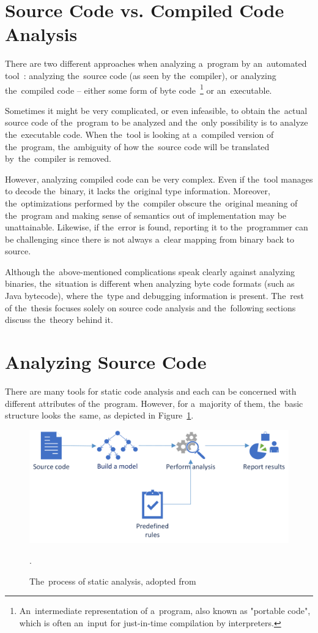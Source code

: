 \documentclass[
  digital, %
  table,   %
  lof,     %
  lot,     %
  oneside,
]{fithesis3}
\begin{document}
\section{Source Code vs. Compiled Code Analysis}
There are two different approaches when analyzing a~program by an~automated tool~\cite{secure-programming-with-sca}: analyzing the~source code (as seen by the~compiler), or analyzing the~compiled code -- either some form of byte code~\footnote{An~intermediate representation of a~program, also known as "portable code", which is often an~input for just-in-time compilation by interpreters.} or an~executable.

Sometimes it might be very complicated, or even infeasible, to obtain the~actual source code of the~program to be analyzed and the~only possibility is to analyze the~executable code. When the~tool is looking at a~compiled version of the~program, the~ambiguity of how the~source code will be translated by~the~compiler is removed.

However, analyzing compiled code can be very complex. Even if the~tool manages to decode the~binary, it lacks the~original type information. Moreover, the~optimizations performed by the~compiler obscure the~original meaning of the~program and making sense of semantics out of implementation may be unattainable. Likewise, if the~error is found, reporting it to the~programmer can be challenging since there is not always a~clear mapping from binary back to source. 

Although the~above-mentioned complications speak clearly against analyzing binaries, the~situation is different when analyzing byte code formats (such as Java bytecode), where the~type and debugging information is present. The~rest of the~thesis focuses solely on source code analysis and the~following sections discuss the~theory behind it.

\section{Analyzing Source Code}
There are many tools for static code analysis and each can be concerned with different attributes of the~program. However, for a~majority of them, the~basic structure looks the~same, as depicted in Figure~\ref{fig:static-code-analysis-internals}.

\begin{figure}[h!]
		\centering
			\includegraphics[scale=0.80]{img/static-code-analysis-internals}
		\caption{The~process of static analysis, adopted from~\cite{secure-programming-with-sca}}.
		\label{fig:static-code-analysis-internals}
\end{figure}
\end{document}
